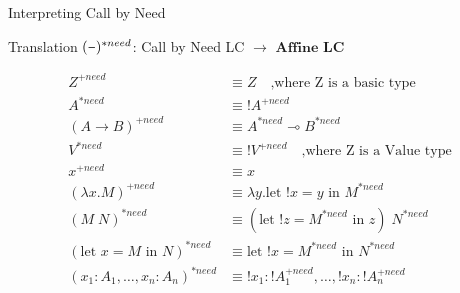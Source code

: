 \documentclass[10pt]{beamer}
\newcommand{\lam}[2]{\lambda #1 . #2}
\newcommand{\llet}[3]{\text{let }  ! #1 = #2 \text{ in } #3}
\newcommand{\plet}[3]{\text{let }   #1 = #2 \text{ in } #3}
\newcommand{\app}[2]{#1 \; #2}
\newcommand{\minus}{\scalebox{0.75}[1.0]{$-$}}
\begin{document}
\begin{frame}[fragile]{Interpreting Call by Need}
  \begin{alertblock}{Translation}
    $(\minus)^{*need}$: Call by Need LC $\to$ $\textbf{Affine LC}$\\
  \end{alertblock}

  \begin{align*}
    Z^{+need}                             & \equiv Z \quad \text{,where Z is a basic type}             \\
    A^{*need}                             & \equiv ! A^{+need}                                         \\
    (A \rightarrow B)^{+need}             & \equiv A^{*need} \multimap B^{*need}                       \\
    V^{*need}                             & \equiv ! V^{+need} \quad \text{,where Z is a Value type}   \\
    x^{+need}                             & \equiv x                                                   \\
    (\lam{x}{M})^{+need}                  & \equiv \lam{y}{\llet{x}{y}{M^{*need}}}                     \\
    (\app{M}{N})^{*need}                  & \equiv \app{(\llet{z}{M^{*need}}{z})}{N^{*need}}           \\
    (\plet{x}{M}{N})^{*need}              & \equiv \llet{x}{M^{*need}}{N^{*need}}                      \\
    (x_1 : A_1, \dots, x_n : A_n)^{*need} & \equiv ! x_1 : ! A_1^{+need}, \dots, ! x_n : ! A_n^{+need} \\
  \end{align*}
\end{frame}
\end{document}
